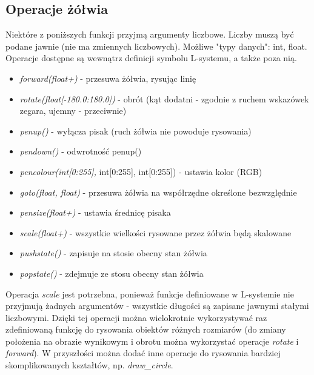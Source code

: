 \documentclass{article}
\begin{document}
\subsection{Operacje żółwia}
Niektóre z poniższych funkcji przyjmą argumenty liczbowe. Liczby muszą być podane jawnie (nie ma zmiennych liczbowych). Możliwe "typy danych": int, float.
Operacje dostępne są wewnątrz definicji symbolu L-systemu, a także poza nią.
\begin{itemize}
    \item{\textit{forward(float+)} - przesuwa żółwia, rysując linię}
    \item{\textit{rotate(float[-180.0:180.0])} - obrót (kąt dodatni - zgodnie z ruchem wskazówek zegara, ujemny - przeciwnie)}
    \item{\textit{penup()} - wyłącza pisak (ruch żółwia nie powoduje rysowania)}
    \item{\textit{pendown()} - odwrotność penup()}
    \item{\textit{pencolour(int[0:255],} int[0:255], int[0:255]) - ustawia kolor (RGB)}
    \item{\textit{goto(float, float)} - przesuwa żółwia na współrzędne określone bezwzględnie}
    \item{\textit{pensize(float+)} - ustawia średnicę pisaka}
    \item{\textit{scale(float+)} - wszystkie wielkości rysowane przez żółwia będą skalowane}
    \item{\textit{pushstate()} - zapisuje na stosie obecny stan żółwia}
    \item{\textit{popstate()} - zdejmuje ze stosu obecny stan żółwia}
\end{itemize}
Operacja \textit{scale} jest potrzebna, ponieważ funkcje definiowane w L-systemie nie przyjmują żadnych argumentów - wszystkie długości są zapisane jawnymi stałymi liczbowymi. Dzięki tej operacji można wielokrotnie wykorzystywać raz zdefiniowaną funkcję do rysowania obiektów różnych rozmiarów (do zmiany położenia na obrazie wynikowym i obrotu można wykorzystać operacje \textit{rotate} i \textit{forward}). W przyszłości można dodać inne operacje do rysowania bardziej skomplikowanych kształtów, np. \textit{draw\_circle}.
\end{document}
